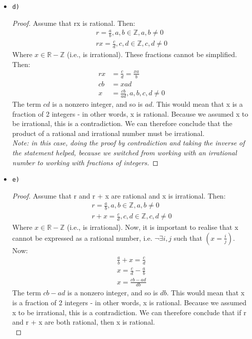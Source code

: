 \begin{solutions}
\begin{itemize}
\begin{proof}
		\emph{Note: in this case, doing the proof by contradiction and taking the inverse of the statement helped, because we switched from working with an irrational number to working with fractions of integers.}
	\end{proof}

	\item \verb|d)|
	\begin{proof}
		Assume that rx is rational. Then:
		\begin{align}
			r = \frac{a}{b}, a, b \in \mathbb{Z}, a, b \ne 0\\
			rx = \frac{c}{d}, c, d \in \mathbb{Z}, c, d \ne 0
		\end{align}
		Where $x \in \mathbb{R} - \mathbb{Z}$ (i.e., is irrational).
		These fractions cannot be simplified. Then:
		\begin{align}
			rx &= \frac{c}{d} = \frac{xa}{b}\\
			cb &= xad\\
			x &= \frac{cb}{ad}, a, b, c, d \ne 0
		\end{align}
		The term $cd$ is a nonzero integer, and so is $ad$. This would mean that x is a fraction of 2 integers - in other words, x is rational. Because we assumed x to be irrational, this is a contradiction. We can therefore conclude that the product of a rational and irrational number must be irrational.\\
		
		\emph{Note: in this case, doing the proof by contradiction and taking the inverse of the statement helped, because we switched from working with an irrational number to working with fractions of integers.}
	\end{proof}

	\item \verb|e)|
	\begin{proof}
		Assume that r and r + x are rational and x is irrational. Then:
		\begin{align}
			r = \frac{a}{b}, a, b \in \mathbb{Z}, a, b \ne 0\\
			r + x = \frac{c}{d}, c, d \in \mathbb{Z}, c, d \ne 0
		\end{align}
		Where $x \in \mathbb{R} - \mathbb{Z}$ (i.e., is irrational).
		Now, it is important to realise that x cannot be expressed as a rational number, i.e. $\neg\exists i, j$ such that $(x = \frac{i}{j})$. Now:
		\begin{align}
			\frac{a}{b} + x = \frac{c}{d}\\
			x = \frac{c}{d} - \frac{a}{b}\\
			x = \frac{cb - ad}{db}
		\end{align}
		The term $cb - ad$ is a nonzero integer, and so is $db$. This would mean that x is a fraction of 2 integers - in other words, x is rational. Because we assumed x to be irrational, this is a contradiction. We can therefore conclude that if r and r + x are both rational, then x is rational.\\
		

\end{proof}
\end{itemize}
\end{solutions}
